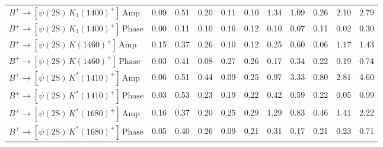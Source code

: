 \begin{tabular}{l  c  c  c  c  c  c  c  c  c  | c }
$B^{+}\rightarrow \left[\psi(\text{2S})\,K_{1}(1400)^{+}\right]\,\text{Amp}$ & 0.09 & 0.51 & 0.20 & 0.11 & 0.10 & 1.34 & 1.09 & 0.26 & 2.10 & 2.79 \\ 
$B^{+}\rightarrow \left[\psi(\text{2S})\,K_{1}(1400)^{+}\right]\,\text{Phase}$ & 0.00 & 0.11 & 0.10 & 0.16 & 0.12 & 0.10 & 0.07 & 0.11 & 0.02 & 0.30 \\ 
$B^{+}\rightarrow \left[\psi(\text{2S})\,K(1460)^{+}\right]\,\text{Amp}$ & 0.15 & 0.37 & 0.26 & 0.10 & 0.12 & 0.25 & 0.60 & 0.06 & 1.17 & 1.43 \\ 
$B^{+}\rightarrow \left[\psi(\text{2S})\,K(1460)^{+}\right]\,\text{Phase}$ & 0.03 & 0.41 & 0.08 & 0.27 & 0.26 & 0.17 & 0.34 & 0.22 & 0.19 & 0.74 \\ 
$B^{+}\rightarrow \left[\psi(\text{2S})\,K^{*}(1410)^{+}\right]\,\text{Amp}$ & 0.06 & 0.51 & 0.44 & 0.09 & 0.25 & 0.97 & 3.33 & 0.80 & 2.81 & 4.60 \\ 
$B^{+}\rightarrow \left[\psi(\text{2S})\,K^{*}(1410)^{+}\right]\,\text{Phase}$ & 0.03 & 0.53 & 0.23 & 0.19 & 0.22 & 0.42 & 0.59 & 0.22 & 0.05 & 0.99 \\ 
$B^{+}\rightarrow \left[\psi(\text{2S})\,K^{*}(1680)^{+}\right]\,\text{Amp}$ & 0.16 & 0.37 & 0.20 & 0.25 & 0.29 & 1.29 & 0.83 & 0.46 & 1.41 & 2.22 \\ 
$B^{+}\rightarrow \left[\psi(\text{2S})\,K^{*}(1680)^{+}\right]\,\text{Phase}$ & 0.05 & 0.40 & 0.26 & 0.09 & 0.21 & 0.31 & 0.17 & 0.21 & 0.23 & 0.71 \\ 
\hline
\hline
\end{tabular}
